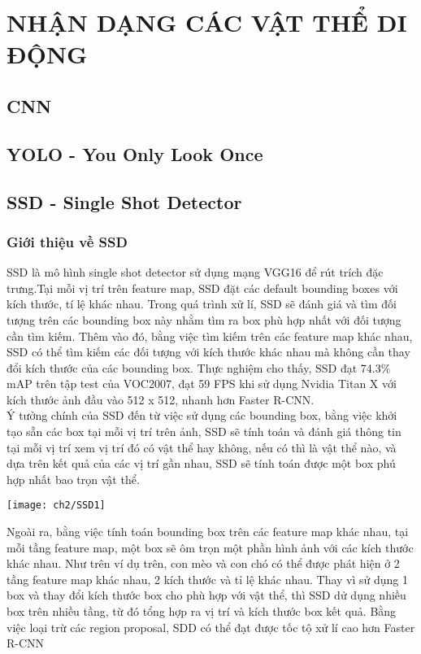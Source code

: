 \chapter{NHẬN DẠNG CÁC VẬT THỂ DI ĐỘNG}

	
\section{CNN}

\section{YOLO - You Only Look Once}

\section{SSD - Single Shot Detector}

\subsection{Giới thiệu về SSD}

  SSD là mô hình single shot detector sử dụng mạng VGG16 để rút trích đặc trưng.Tại mỗi vị trí trên feature map, SSD đặt các default bounding boxes với kích thước, tí lệ khác nhau. Trong quá trình xử lí, SSD sẽ đánh giá và tìm đối tượng trên các bounding box này nhằm tìm ra box phù hợp nhất với đối tượng cần tìm kiếm. Thêm vào đó, bằng việc tìm kiếm trên các feature map khác nhau, SSD có thể tìm kiếm các đối tượng với kích thước khác nhau mà không cần thay đổi kích thước của các bounding box. Thực nghiệm cho thấy, SSD đạt 74.3\% mAP trên tập test của VOC2007, đạt 59 FPS khi sử dụng Nvidia Titan X với kích thước ảnh đầu vào 512 x 512, nhanh hơn Faster R-CNN.
  \\Ý tưởng chính của SSD đến từ việc sử dụng các bounding box, bằng việc khởi tạo sẵn các box tại mỗi vị trí trên ảnh, SSD sẽ tính toán và đánh giá thông tin tại mỗi vị trí xem vị trí đó có vật thể hay không, nếu có thì là vật thể nào, và dựa trên kết quả của các vị trí gần nhau, SSD sẽ tính toán được một box phú hợp nhất bao trọn vật thể.
  \begin{center}
  \texttt{[image: ch2/SSD1]}
  \end{center}
  Ngoài ra, bằng việc tính toán bounding box trên các feature map khác nhau, tại mỗi tầng feature map, một box sẽ ôm trọn một phần hình ảnh với các kích thước khác nhau. Như trên ví dụ trên, con mèo và con chó có thể được phát hiện ở 2 tầng feature map khác nhau, 2 kích thước và tỉ lệ khác nhau. Thay vì sử dụng 1 box và thay đổi kích thước box cho phù hợp với vật thể, thì SSD dử dụng nhiều box trên nhiều tầng, từ đó tổng hợp ra vị trí và kích thước box kết quả. Bằng việc loại trừ các region proposal, SDD có thể đạt được tốc tộ xử lí cao hơn Faster R-CNN
